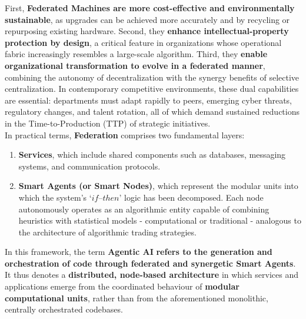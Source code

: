 \documentclass{article}
\begin{document}
First, \textbf{Federated Machines are more cost-effective and environmentally sustainable}, as upgrades can be achieved more accurately and by recycling or repurposing existing hardware. Second, they \textbf{enhance intellectual-property protection by design}, a critical feature in organizations whose operational fabric increasingly resembles a large-scale algorithm. Third, they \textbf{enable organizational transformation to evolve in a federated manner}, combining the autonomy of decentralization with the synergy benefits of selective centralization. In contemporary competitive environments, these dual capabilities are essential: departments must adapt rapidly to peers, emerging cyber threats, regulatory changes, and talent rotation, all of which demand sustained reductions in the Time-to-Production (TTP) of strategic initiatives.\\

In practical terms, \textbf{Federation} comprises two fundamental layers:
\begin{enumerate}
    \item \textbf{Services}, which include shared components such as databases, messaging systems, and communication protocols.
    \item \textbf{Smart Agents (or Smart Nodes)}, which represent the modular units into which the system’s \begin{math} ‘if–then’\end{math} logic has been decomposed. Each node autonomously operates as an algorithmic entity capable of combining heuristics with statistical models - computational or traditional - analogous to the architecture of algorithmic trading strategies.
\end{enumerate}

In this framework, the term \textbf{Agentic AI}\textbf{ refers to the generation and orchestration of code through federated and synergetic Smart Agents}. It thus denotes a \textbf{distributed, node-based architecture} in which services and applications emerge from the coordinated behaviour of \textbf{modular computational units}, rather than from the aforementioned monolithic, centrally orchestrated codebases.\\
\end{document}
